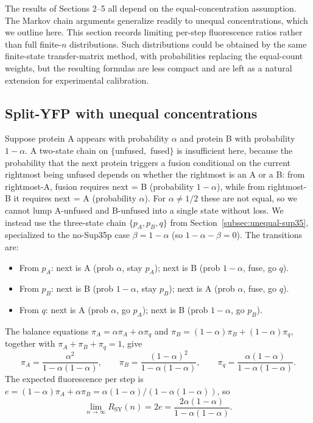 \documentclass[referee,lineno,pdflatex,sn-mathphys-ay]{sn-jnl}
\begin{document}
The results of Sections 2--5 all depend on the equal-concentration assumption. The Markov chain arguments generalize readily to unequal concentrations, which we outline here. This section records limiting per-step fluorescence ratios rather than full finite-$n$ distributions. Such distributions could be obtained by the same finite-state transfer-matrix method, with probabilities replacing the equal-count weights, but the resulting formulas are less compact and are left as a natural extension for experimental calibration.

\subsection{Split-YFP with unequal concentrations}
Suppose protein A appears with probability $\alpha$ and protein B with probability $1 - \alpha$. A two-state chain on $\{$unfused$, $ fused$\}$ is insufficient here, because the probability that the next protein triggers a fusion conditional on the current rightmost being unfused depends on whether the rightmost is an A or a B: from rightmost-A, fusion requires next = B (probability $1 - \alpha$), while from rightmost-B it requires next = A (probability $\alpha$). For $\alpha \neq 1/2$ these are not equal, so we cannot lump A-unfused and B-unfused into a single state without loss. We instead use the three-state chain $\{p_A, p_B, q\}$ from Section~\ref{subsec:unequal-sup35}, specialized to the no-Sup35p case $\beta = 1 - \alpha$ (so $1 - \alpha - \beta = 0$). The transitions are:
\begin{itemize}
\item From $p_A$: next is A (prob $\alpha$, stay $p_A$); next is B (prob $1{-}\alpha$, fuse, go $q$).
\item From $p_B$: next is B (prob $1{-}\alpha$, stay $p_B$); next is A (prob $\alpha$, fuse, go $q$).
\item From $q$: next is A (prob $\alpha$, go $p_A$); next is B (prob $1{-}\alpha$, go $p_B$).
\end{itemize}
The balance equations $\pi_A = \alpha \pi_A + \alpha \pi_q$ and $\pi_B = (1{-}\alpha)\pi_B + (1{-}\alpha)\pi_q$, together with $\pi_A + \pi_B + \pi_q = 1$, give
\[
\pi_A = \frac{\alpha^2}{1 - \alpha(1-\alpha)}, \qquad \pi_B = \frac{(1-\alpha)^2}{1 - \alpha(1-\alpha)}, \qquad \pi_q = \frac{\alpha(1-\alpha)}{1 - \alpha(1-\alpha)}.
\]
The expected fluorescence per step is $e = (1-\alpha)\pi_A + \alpha\pi_B = \alpha(1-\alpha)/(1 - \alpha(1-\alpha))$, so
\[
\lim_{n \to \infty} R_{\text{SY}}(n) = 2e = \frac{2\alpha(1-\alpha)}{1 - \alpha(1-\alpha)}.
\]
\end{document}
